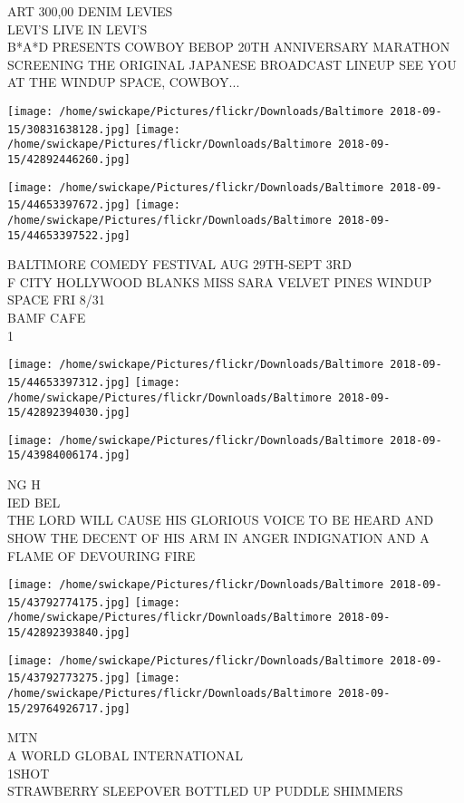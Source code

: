 \documentclass[10pt,letterpaper]{article}
\begin{document}
ART 300,00 DENIM LEVIES\\
LEVI'S LIVE IN LEVI'S\\
B*A*D PRESENTS COWBOY BEBOP 20TH ANNIVERSARY MARATHON SCREENING THE ORIGINAL JAPANESE BROADCAST LINEUP SEE YOU AT THE WINDUP SPACE, COWBOY...\\
\pagebreak

\texttt{[image: /home/swickape/Pictures/flickr/Downloads/Baltimore 2018-09-15/30831638128.jpg]}
\texttt{[image: /home/swickape/Pictures/flickr/Downloads/Baltimore 2018-09-15/42892446260.jpg]}

\texttt{[image: /home/swickape/Pictures/flickr/Downloads/Baltimore 2018-09-15/44653397672.jpg]}
\texttt{[image: /home/swickape/Pictures/flickr/Downloads/Baltimore 2018-09-15/44653397522.jpg]}

BALTIMORE COMEDY FESTIVAL AUG 29TH{-}SEPT 3RD\\
F CITY HOLLYWOOD BLANKS MISS SARA VELVET PINES WINDUP SPACE FRI 8/31\\
BAMF CAFE\\
1\\
\pagebreak

\texttt{[image: /home/swickape/Pictures/flickr/Downloads/Baltimore 2018-09-15/44653397312.jpg]}
\texttt{[image: /home/swickape/Pictures/flickr/Downloads/Baltimore 2018-09-15/42892394030.jpg]}

\vspace{0.25in}
\texttt{[image: /home/swickape/Pictures/flickr/Downloads/Baltimore 2018-09-15/43984006174.jpg]}

NG H\\
IED BEL\\
THE LORD WILL CAUSE HIS GLORIOUS VOICE TO BE HEARD AND SHOW THE DECENT OF HIS ARM IN ANGER INDIGNATION AND A FLAME OF DEVOURING FIRE\\
\pagebreak

\texttt{[image: /home/swickape/Pictures/flickr/Downloads/Baltimore 2018-09-15/43792774175.jpg]}
\texttt{[image: /home/swickape/Pictures/flickr/Downloads/Baltimore 2018-09-15/42892393840.jpg]}

\texttt{[image: /home/swickape/Pictures/flickr/Downloads/Baltimore 2018-09-15/43792773275.jpg]}
\texttt{[image: /home/swickape/Pictures/flickr/Downloads/Baltimore 2018-09-15/29764926717.jpg]}

MTN\\
A WORLD GLOBAL INTERNATIONAL\\
1SHOT\\
STRAWBERRY SLEEPOVER BOTTLED UP PUDDLE SHIMMERS\\
\pagebreak
\end{document}

